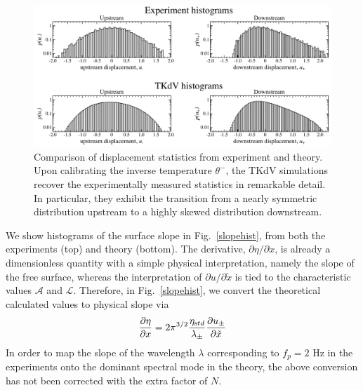 \documentclass[11pt]{article}
\newcommand{\pd}[2]    { \frac{\partial #1} {\partial #2} }
\newcommand{\freqp}{f_p}
\newcommand{\etastd}{\eta_{\text std}}
\newcommand{\lam}{\lambda}
\newcommand{\lamupdn}{\lam_{\pm}}
\newcommand{\lamfac}{N}
\newcommand{\ampscale}{\mathcal{A}}
\newcommand{\lengthscale}{\mathcal{L}}
\newcommand{\uupdn}{u_{\pm}}
\newcommand{\thup}{\theta^{-}}
\begin{document}
\begin{figure}%
\begin{center}
\includegraphics[width = 0.99 \linewidth]{Figs/uhist.pdf}
\caption{ 
Comparison of displacement statistics from experiment and theory. Upon calibrating the inverse temperature $\thup$, the TKdV simulations recover the experimentally measured statistics in remarkable detail. In particular, they exhibit the transition from a nearly symmetric distribution upstream to a highly skewed distribution downstream.
}
\label{uhist}
\end{center}
\end{figure}

We show histograms of the surface slope in Fig.~\ref{slopehist}, from both the experiments (top) and theory (bottom). The derivative, $\partial \eta / \partial x$, is already a dimensionless quantity with a simple physical interpretation, namely the slope of the free surface, whereas the interpretation of $\partial u/\partial \tilde{x}$ is tied to the characteristic values $\ampscale$ and $\lengthscale$. 
Therefore, in Fig.~\ref{slopehist}, we convert the theoretical calculated values to physical slope via
\begin{equation}
\pd{\eta}{x} = 2 \pi^{3/2} \frac{\etastd}{\lamupdn} \pd{\uupdn}{\tilde{x}}
\end{equation}
In order to map the slope of the wavelength $\lam$ corresponding to $\freqp = 2$ Hz in the experiments onto the dominant spectral mode in the theory, the above conversion has not been corrected with the extra factor of $\lamfac$.
\end{document}
